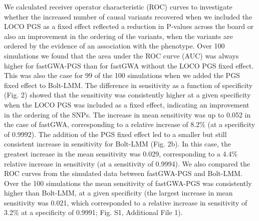 \documentclass[fleqn,10pt]{wlscirep}
\begin{document}
\par We calculated receiver operator characteristic (ROC) curves to investigate whether the increased number of causal variants recovered when we included the LOCO PGS as a fixed effect reflected a reduction in P-values across the board or also an improvement in the ordering of the variants, when the variants are ordered by the evidence of an association with the phenotype. Over 100 simulations we found that the area under the ROC curve (AUC) was always higher for fastGWA-PGS than for fastGWA without the LOCO PGS fixed effect. This was also the case for 99 of the 100 simulations when we added the PGS fixed effect to Bolt-LMM. The difference in sensitivity as a function of specificity (Fig. 2) showed that the sensitivity was consistently higher at a given specificity when the LOCO PGS was included as a fixed effect, indicating an improvement in the ordering of the SNPs. The increase in mean sensitivity was up to 0.052 in the case of fastGWA, corresponding to a relative increase of 8.2\% (at a specificity of 0.9992). The addition of the PGS fixed effect led to a smaller but still consistent increase in sensitivity for Bolt-LMM (Fig. 2b). In this case, the greatest increase in the mean sensitivity was 0.029, corresponding to a 4.4\% relative increase in sensitivity (at a sensitivity of 0.9994). We also compared the ROC curves from the simulated data between fastGWA-PGS and Bolt-LMM. Over the 100 simulations the mean sensitivity of fastGWA-PGS was consistently higher than Bolt-LMM, at a given specificity (the largest increase in mean sensitivity was 0.021, which corresponded to a relative increase in sensitivity of 3.2\% at a specificity of 0.9991; Fig. S1, Additional File 1).
\par
\end{document}
